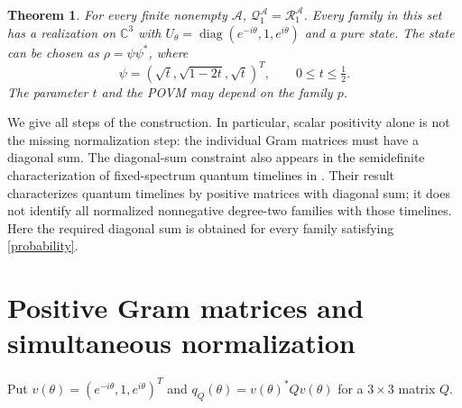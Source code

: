 \documentclass[11pt]{article}
\newtheorem{theorem}{Theorem}
\newcommand{\C}{\mathbb C}
\newcommand{\diag}{\operatorname{diag}}
\begin{document}
\begin{theorem}\label{main}
For every finite nonempty $\mathcal A$,
$\mathcal Q_1^{\mathcal A}=\mathcal R_1^{\mathcal A}$.
Every family in this set has a realization on $\C^3$ with
$U_\theta=\diag(e^{-i\theta},1,e^{i\theta})$ and a pure state.
The state can be chosen as $\rho=\psi\psi^*$, where
\[
 \psi=(\sqrt t,\sqrt{1-2t},\sqrt t)^T,
 \qquad 0\leq t\leq\tfrac12.
\]
The parameter $t$ and the POVM may depend on the family $p$.
\end{theorem}

We give all steps of the construction. In particular, scalar positivity
alone is not the missing normalization step: the individual Gram matrices
must have a diagonal sum. The diagonal-sum constraint also appears in the
semidefinite characterization of fixed-spectrum quantum timelines in
\cite[\S III.B, Eqs.~(44)--(47)]{Navascues}. Their result characterizes
quantum timelines by positive matrices with diagonal sum; it does not identify
all normalized nonnegative degree-two families with those timelines.
Here the required diagonal sum is obtained for every family
satisfying \eqref{probability}.

\section{Positive Gram matrices and simultaneous normalization}
Put $v(\theta)=(e^{-i\theta},1,e^{i\theta})^T$ and
$q_Q(\theta)=v(\theta)^*Qv(\theta)$ for a $3\times3$ matrix $Q$.
\end{document}
